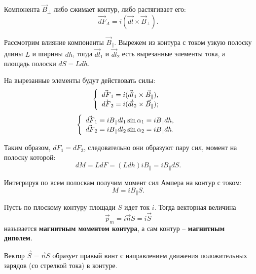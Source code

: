    Компонента \( \vec{B}_{\perp} \) либо сжимает контур, либо растягивает его:
    \[
        \vec{dF}_A = i(\vec{dl} \times \vec{B}_{\perp}).
    \]
    
    Рассмотрим влияние компоненты \( \vec{B}_{\|} \). Вырежем из контура с током
    узкую полоску длины \( L \) и ширины \( dh \), тогда \( \vec{dl}_1 \) и 
    \( \vec{dl}_2 \) есть вырезанные элементы тока, а площадь полоски
    \( dS = Ldh \).
    
    На вырезанные элементы будут действовать силы:
    \[
        \left\{
        \begin{array}{c}
            \vec{dF}_1 = i(\vec{dl}_1 \times \vec{B}_{\|}), \\
            \vec{dF}_2 = i(\vec{dl}_2 \times \vec{B}_{\|});
        \end{array}
        \right. \\
    \]
    \[
        \left\{
        \begin{array}{c}
            \vec{dF}_1 = iB_{\|}dl_1\sin\alpha_1 = iB_{\|}dh, \\
            \vec{dF}_2 = iB_{\|}dl_2\sin\alpha_2 = iB_{\|}dh.
        \end{array}
        \right. \\
    \]

    Таким образом, \( dF_1 = dF_2 \), следовательно они образуют пару сил,
    момент на полоску которой:
    \[
        dM = LdF = (Ldh)iB_{\|} = iB_{\|}dS.
    \]
    
    Интегрируя по всем полоскам получим момент сил Ампера на контур с током:
    \begin{equation}
        M = iB_{\|}S.
        \label{eq8:2a}
    \end{equation}
    
    \begin{definition}
        Пусть по плоскому контуру площади \( S \) идет ток \( i \). Тогда
        векторная величина
        \begin{equation}
            \vec{p}_m = i\vec{n}S = i\vec{S}
            \label{eq8:2b}
        \end{equation}
        называется \textbf{магнитным моментом контура}, а сам контур --
        \textbf{магнитным диполем}.
    
        Вектор \( \vec{S} = \vec{n}S \) образует правый винт с направлением
        движения положительных зарядов (со стрелкой тока) в контуре.
    \end{definition}
    
